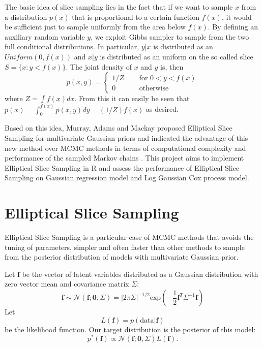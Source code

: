 \documentclass{article}
\begin{document}
The basic idea of slice sampling lies in the fact that if we want to sample $x$ from a distribution $p(x)$ that is proportional to a certain function $f(x)$, it would be sufficient just to sample uniformly from the area below $f(x)$.
By defining an auxiliary random variable $y$, we exploit Gibbs sampler to sample from the two full conditional distributions. In particular, $y|x$ is distributed as an $Uniform(0,f(x))$ and $x|y$ is distributed as an uniform on the so called slice $S=\lbrace x: y<f(x)\rbrace$. The joint density of $x$ and $y$ is, then $$p(x,y)=\begin{cases}1/Z\quad&\text{ for }0<y<f(x)\\0\quad&\text{ otherwise}\end{cases}$$where $Z=\int f(x)dx$. From this it can easily be seen that $p(x)=\int_0^{f(x)} p(x,y)dy=(1/Z)f(x)$ as desired. 

Based on this idea, Murray, Adams and Mackay proposed Elliptical Slice Sampling for multivariate Gaussian priors and indicated the advantage of this new method over MCMC methods in terms of computational complexity and performance of the sampled Markov chains \cite{MAM}. This project aims to implement Elliptical Slice Sampling in R and assess the performance of Elliptical Slice Sampling on Gaussian regression model and Log Gaussian Cox process model.

\section{Elliptical Slice Sampling}

Elliptical Slice Sampling is a particular case of MCMC methods that avoids the tuning of parameters, simpler and often faster than other methods to sample from the posterior distribution of models with multivariate Gaussian prior.

Let $\mathbf{f}$ be the vector of latent variables distributed as a Gaussian distribution with zero vector mean and covariance matrix $\Sigma$: $$\mathbf{f}\sim\mathcal{N}(\mathbf{f};\mathbf{0}, \Sigma)=|2\pi\Sigma|^{-1/2}\text{exp}\left(-\frac{1}{2}\mathbf{f}^T\Sigma^{-1}\mathbf{f}\right)$$ Let $$L(\mathbf{f})=p(\text{data}|\mathbf{f})$$ be the likelihood function. Our target distribution is the posterior of this model: $$p^*(\mathbf{f})\propto \mathcal{N}(\mathbf{f};\mathbf{0}, \Sigma)L(\mathbf{f}).$$
\end{document}
